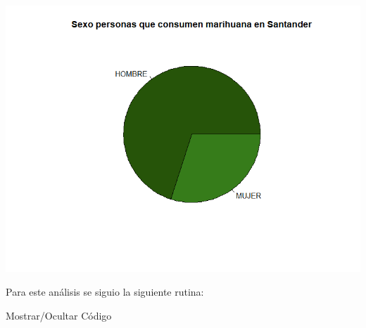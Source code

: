 \documentclass[
]{article}
\begin{document}
\includegraphics{images/marihuana S santander.png}

Para este análisis se siguio la siguiente rutina:

Mostrar/Ocultar Código
\end{document}
